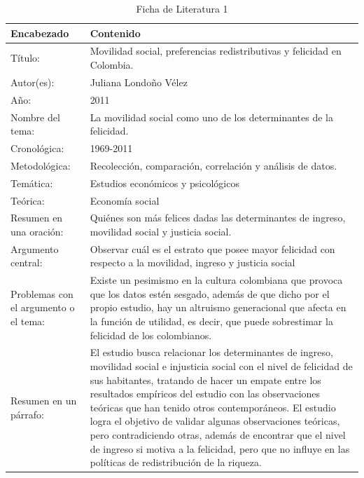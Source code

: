 \documentclass[12pt,oneside,letterpaper,spanish]{article}
\begin{document}
\begin{table}[htbp]
    \caption{Ficha de Literatura 1}
    \begin{center}
        \begin{tabular}{  m{3cm} | m{12cm}  }
        \hline\textbf{ Encabezado} & \textbf{Contenido }\\ \hline
        Título: & Movilidad social, preferencias redistributivas y felicidad en Colombia. \\ \hline
        Autor(es): & Juliana Londoño Vélez \\ \hline
        Año: & 2011 \\ \hline
        Nombre del tema: & La movilidad social como uno de los determinantes de la felicidad. \\ \hline
        Cronológica: &  1969-2011 \\ \hline
        Metodológica: & Recolección, comparación, correlación y análisis de datos. \\ \hline
        Temática: & Estudios económicos y psicológicos \\  \hline
        Teórica: & Economía social \\ \hline
        Resumen en una oración: & Quiénes son más felices dadas las determinantes de ingreso, movilidad social y justicia social. \\ \hline
        Argumento central: &  Observar cuál es el estrato que posee mayor felicidad con respecto a la movilidad, ingreso y justicia social \\ \hline
        Problemas con el argumento o el tema: & Existe un pesimismo en la cultura colombiana que provoca que los datos estén sesgado, además de que dicho por el propio estudio, hay un altruismo generacional que afecta en la función de utilidad, es decir, que puede sobrestimar la felicidad de los colombianos. \\ \hline
        Resumen en un párrafo: & El estudio busca relacionar los determinantes de ingreso, movilidad social e injusticia social con el nivel de felicidad de sus habitantes, tratando de hacer un empate entre los resultados empíricos del estudio con las observaciones teóricas que han tenido otros contemporáneos. El estudio logra el objetivo de validar algunas observaciones teóricas, pero contradiciendo otras, además de encontrar que el nivel de ingreso si motiva a la felicidad, pero que no influye en las políticas de redistribución de la riqueza. \\ \hline
        \end{tabular}
    \end{center}
\end{table}
\end{document}
